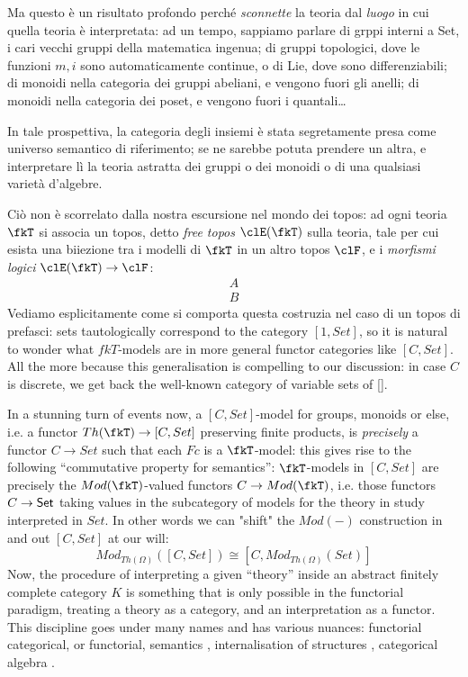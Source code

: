 \documentclass{amsart}
\begin{document}
Ma questo è un risultato profondo perché \emph{sconnette} la teoria dal \emph{luogo} in cui quella teoria è interpretata: ad un tempo, sappiamo parlare di grppi interni a Set, i cari vecchi gruppi della matematica ingenua; di gruppi topologici, dove le funzioni $m,i$ sono automaticamente continue, o di Lie, dove sono differenziabili; di monoidi nella categoria dei gruppi abeliani, e vengono fuori gli anelli;  di monoidi nella categoria dei poset, e vengono fuori i quantali\dots

In tale prospettiva, la categoria degli insiemi è stata segretamente presa come universo semantico di riferimento; se ne sarebbe potuta prendere un altra, e interpretare lì la teoria astratta dei gruppi o dei monoidi o di una qualsiasi varietà d'algebre.

Ciò non è scorrelato dalla nostra escursione nel mondo dei topos: ad ogni teoria $\fkT$ si associa un topos, detto \emph{free topos} $\clE(\fkT)$ sulla teoria, tale per cui esista una biiezione tra i modelli di $\fkT$ in un altro topos $\clF$, e i \emph{morfismi logici} $\clE(\fkT) \to \clF$:
\[\begin{array}{c}
  A \\ \hline  B
\end{array}\]
Vediamo esplicitamente come si comporta questa costruzia nel caso di un topos di prefasci: sets tautologically correspond to the category $[1,Set]$, so it is natural to wonder what $fkT$-models are in more general functor categories like $[C,Set]$. All the more because this generalisation is compelling to our discussion: in case $C$ is discrete, we get back the well-known category of variable sets of \ref{}.

In a stunning turn of events now, a $[C,Set]$-model for groups, monoids or else, i.e. a functor $Th(\fkT)\to [C,Set]$ preserving finite products, is \emph{precisely} a functor $C\to Set$ such that each $Fc$ is a $\fkT$-model: this gives rise to the following ``commutative property for semantics'': $\fkT$-models in $[C,Set]$ are precisely the $Mod(\fkT)$-valued functors $C\to Mod(\fkT)$, i.e. those functors $C \to \mathsf{Set}$ taking values in the subcategory of models for the theory in study interpreted in $Set$. In other words we can "shift" the $Mod(-)$ construction in and out $[C,Set]$ at our will:
\[ 
  Mod_{Th(\Omega)}([C,Set]) \cong [C, Mod_{Th(\Omega)}(Set)]
\]
Now, the procedure of interpreting a given ``theory'' inside an abstract finitely complete category $K$ is something that is only possible in the functorial paradigm, treating a theory as a category, and an interpretation as a functor. This discipline goes under many names and has various nuances: functorial categorical, or functorial, semantics \cite{}, internalisation of structures \cite{}, categorical algebra \cite{}.
\end{document}
